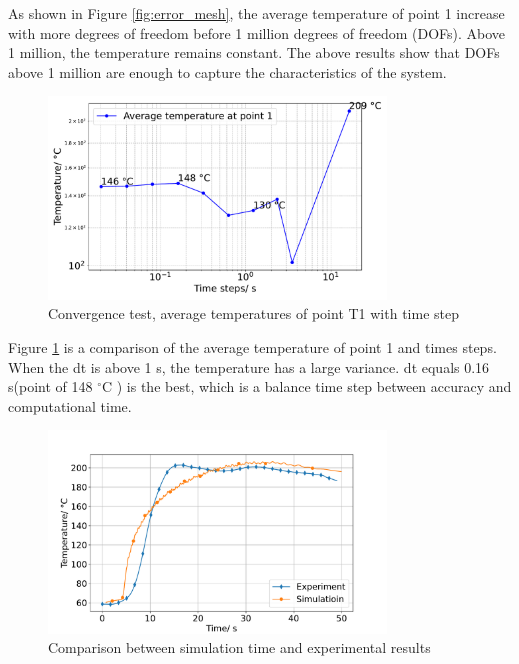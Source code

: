  As shown in Figure \ref{fig:error_mesh}, the average temperature of point 1 increase with more degrees of freedom before 1 million degrees of freedom (DOFs). Above 1 million, the temperature remains constant.  The above results show that DOFs above 1 million are enough to capture the characteristics of the system. 
\begin{figure}[h]
    \centering
  
    \includegraphics[width=0.8\textwidth]{book/chapters/zhang/graphics/T_ave_vs_dt.pdf}
    \caption{Convergence test, average temperatures of point T1 with time step}
    \label{fig:error_time}
\end{figure}


Figure \ref{fig:error_time} is a comparison of the average temperature of point 1 and times steps. When the dt is above 1 s, the temperature has a large variance.  dt equals 0.16 s(point of 148 $^{\circ}\text{C}$ ) is the best, which is a balance time step between accuracy and computational time.

\begin{figure}[h]
    \centering
    \includegraphics[width=0.8\textwidth]{book/chapters/zhang/graphics/T_sim_exe.pdf}
    \caption{Comparison between simulation time and experimental results}
    \label{fig:experiment}
\end{figure}

